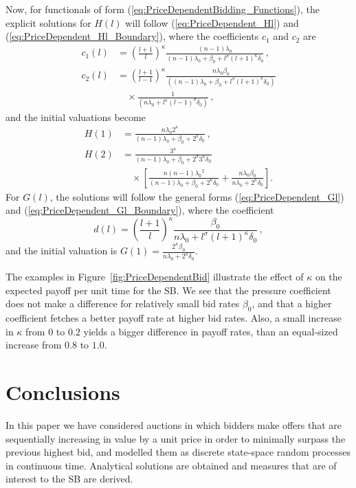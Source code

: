\documentclass{comjnl}
\begin{document}
Now, for functionals of form
(\ref{eq:PriceDependentBidding_Functions}), the explicit solutions
for $H(l)$ will follow (\ref{eq:PriceDependent_Hl}) and
(\ref{eq:PriceDependent_Hl_Boundary}), where the coefficients
$c_1$ and $c_2$ are
\begin{align}
c_1(l) &=
\left(\frac{l+1}{l}\right)^\kappa \frac{(n-1)\lambda_0} {(n-1)\lambda_0 + \beta_0 + l^\sigma(l+1)^\kappa\delta_0}   \,,\\
c_2(l) &= \left(\frac{l+1}{l-1}\right)^\kappa
\frac{n\lambda_0\beta_0}{\left((n-1)\lambda_0+\beta_0+l^\sigma(l+1)^\kappa
\delta_0 \right) } \nonumber \\
&\quad \times \frac{1}{\left(n\lambda_0 + l^\kappa (l-1)^\sigma
\delta_0 \right)}  \,,\nonumber
\end{align}
and the initial valuations become
\begin{align}
H(1) &=
\frac{n\lambda_0 2^\kappa}{(n-1)\lambda_0+\beta_0+2^\kappa\delta_0} \,,\\
H(2) &= \frac{3^\kappa}{(n-1)\lambda_0 + \beta_0 + 2^\sigma
3^\kappa \delta_0 }\nonumber\\
&\quad \times\left[\frac{n(n-1){\lambda_0}^2}{(n-1)\lambda_0 +
\beta_0 + 2^\kappa \delta_0}+ \frac{n\lambda_0 \beta_0}
{n\lambda_0 + 2^\kappa\delta_0 } \right] \nonumber.
\end{align}
For $G(l)$, the solutions will follow the general forms
(\ref{eq:PriceDependent_Gl}) and
(\ref{eq:PriceDependent_Gl_Boundary}), where the coefficient
\begin{equation}
d(l) = \left(\frac{l+1}{l}\right)^\kappa \frac{\beta_0}{n\lambda_0
+ l^\sigma(l+1)^\kappa \delta_0} \,,
\end{equation}
and the initial valuation is $G(1) = \frac{2^\kappa \beta_0}
{n\lambda_0 + 2^\kappa\delta_0 }$.


The examples in Figure~\ref{fig:PriceDependentBid} illustrate the
effect of $\kappa$ on the expected payoff per unit time for the
SB. We see that the pressure coefficient does not make a
difference for relatively small bid rates $\beta_0$, and that a
higher coefficient fetches a better payoff rate at higher bid
rates. Also, a small increase in $\kappa$ from $0$ to $0.2$ yields
a bigger difference in payoff rates, than an equal-sized increase
from $0.8$ to $1.0$.


\section{Conclusions} \label{Conclusions}
In this paper we have considered auctions in which bidders make
offers that are sequentially increasing in value by a unit price
in order to minimally surpass the previous highest bid, and
modelled them as discrete state-space random processes in
continuous time. Analytical solutions are obtained and measures
that are of interest to the SB are derived.
\end{document}
